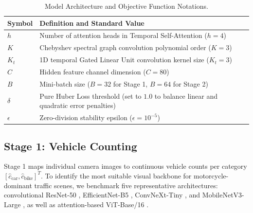 \documentclass[a4paper,fleqn]{cas-sc}
\begin{document}
\begin{table}[pos=htbp]
\centering
\footnotesize
\setlength{\tabcolsep}{4pt}
\renewcommand{\arraystretch}{1.1}
\caption{Model Architecture and Objective Function Notations.}
\label{tab:model_notations}
\begin{tabular}{ll}
\toprule
\textbf{Symbol} & \textbf{Definition and Standard Value} \\
\midrule
$h$ & Number of attention heads in Temporal Self-Attention ($h = 4$) \\
$K$ & Chebyshev spectral graph convolution polynomial order ($K = 3$) \\
$K_t$ & 1D temporal Gated Linear Unit convolution kernel size ($K_t = 3$) \\
$C$ & Hidden feature channel dimension ($C = 80$) \\
$B$ & Mini-batch size ($B = 32$ for Stage 1, $B = 64$ for Stage 2) \\
$\delta$ & Pure Huber Loss threshold (set to $1.0$ to balance linear and quadratic error penalties) \\
$\epsilon$ & Zero-division stability epsilon ($\epsilon = 10^{-5}$) \\
\bottomrule
\end{tabular}%
\end{table}

\subsection{Stage 1: Vehicle Counting}
\label{sec:subproblem1}

Stage 1 maps individual camera images to continuous vehicle counts per category $[\hat{c}_{\text{car}}, \hat{c}_{\text{bike}}]^T$. To identify the most suitable visual backbone for motorcycle-dominant traffic scenes, we benchmark five representative architectures: convolutional ResNet-50 \cite{resnet}, EfficientNet-B5 \cite{efficientnet}, ConvNeXt-Tiny \cite{convnext}, and MobileNetV3-Large \cite{mobilenet}, as well as attention-based ViT-Base/16 \cite{vit}.
\end{document}
